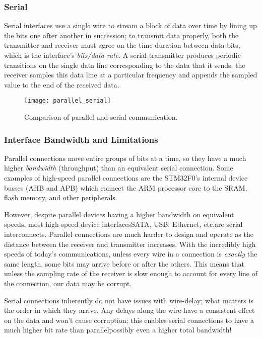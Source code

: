 \documentclass[openany,11pt,fleqn]{book} %
\begin{document}
\subsubsection{Serial}
Serial interfaces use a single wire to stream a block of data over time by lining up the bits one after another in succession; to transmit data properly, both the transmitter and receiver must agree on the time duration between data bits, which is the interface's \textit{bits/data rate}. A serial transmitter produces periodic transitions on the single data line corresponding to the data that it sends; the receiver samples this data line at a particular frequency and appends the sampled value to the end of the received data. 

\begin{figure}[]
    \centering\texttt{[image: parallel\_serial]}
    \caption{Comparison of parallel and serial communication.}
    \label{parallel_serial}
\end{figure}

\subsubsection{Interface Bandwidth and Limitations}
Parallel connections move entire groups of bits at a time, so they have a much higher \textit{bandwidth} (throughput) than an equivalent serial connection. Some examples of high-speed parallel connections are the STM32F0's internal device busses (AHB and APB) which connect the ARM processor core to the SRAM, flash memory, and other peripherals.

However, despite parallel devices having a higher bandwidth on equivalent speeds, most high-speed device interfaces\textemdash SATA, USB, Ethernet, etc.\textemdash are serial interconnects. Parallel connections are much harder to design and operate as the distance between the receiver and transmitter increases. With the incredibly high speeds of today's communications, unless every wire in a connection is \textit{exactly} the same length, some bits may arrive before or after the others. This means that unless the sampling rate of the receiver is slow enough to account for every line of the connection, our data may be corrupt.

Serial connections inherently do not have issues with wire-delay; what matters is the order in which they arrive. Any delays along the wire have a consistent effect on the data and won't cause corruption; this enables serial connections to have a much higher bit rate than parallel\textemdash possibly even a higher total bandwidth!
\end{document}
